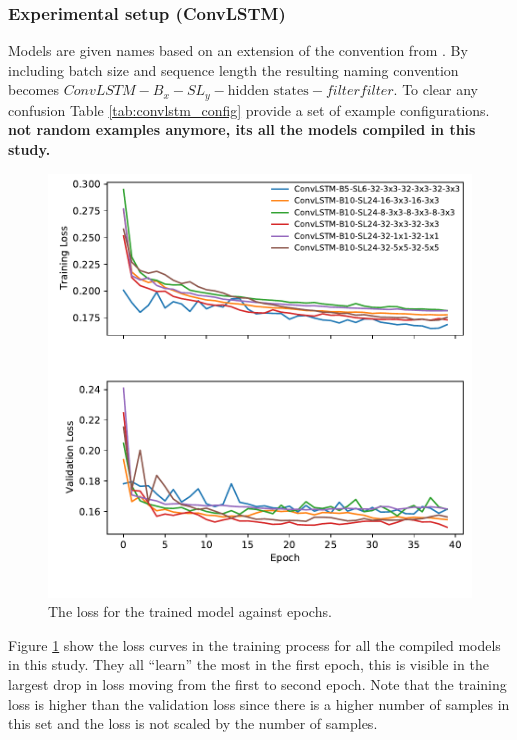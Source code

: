 \subsubsection{Experimental setup (ConvLSTM)}
Models are given names based on an extension of the convention from .
By including batch size and sequence length %
the resulting naming convention becomes  $ConvLSTM-B_{x}-SL_{y}-\text{hidden states}-filter$\times$filter$. To clear any confusion Table \ref{tab:convlstm_config} provide a set of example configurations. \textbf{not random examples anymore, its all the models compiled in this study.}

\begin{figure}
    \centering
    \includegraphics{python_figs/epoch_vs_loss.pdf}
    \caption{The loss for the trained model against epochs.}
    \label{fig:convlstm_loss}
\end{figure}
Figure \ref{fig:convlstm_loss} show the loss curves in the training process for all the compiled models in this study. They all ``learn'' the most in the first epoch, this is visible in the largest drop in loss moving from the first to second epoch. Note that the training loss is higher than the validation loss since there is a higher number of samples in this set and the loss is not scaled by the number of samples. 

